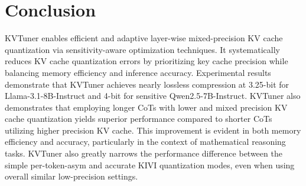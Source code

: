\section{Conclusion}
KVTuner enables efficient and adaptive layer-wise mixed-precision KV cache quantization via sensitivity-aware optimization techniques. It systematically reduces KV cache quantization errors by prioritizing key cache precision while balancing memory efficiency and inference accuracy. Experimental results demonstrate that KVTuner achieves nearly lossless compression at 3.25-bit for Llama-3.1-8B-Instruct and 4-bit for sensitive Qwen2.5-7B-Instruct.  
KVTuner also demonstrates that employing longer CoTs with lower and mixed precision KV cache quantization yields superior performance compared to shorter CoTs utilizing higher precision KV cache. This improvement is evident in both memory efficiency and accuracy, particularly in the context of mathematical reasoning tasks. KVTuner also greatly narrows the performance difference between the simple per-token-asym and accurate KIVI quantization modes, even when using overall similar low-precision settings.







